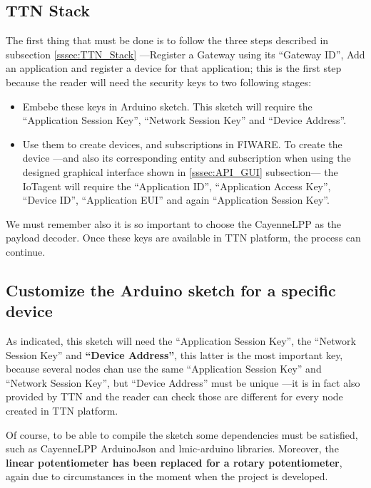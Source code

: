 \documentclass[11pt,a4paper,dvipsnames,twoside]{article}
\begin{document}
\subsection{TTN Stack}
The first thing that must be done is to follow the three steps described in subsection \ref{sssec:TTN_Stack} ---Register a Gateway using its \enquote{Gateway ID}, Add an application and register a device for that application; this is the first step because the reader will need the security keys to two following stages:

\begin{itemize}
  \item Embebe these keys in Arduino sketch. This sketch will require the \enquote{Application Session Key}, \enquote{Network Session Key} and \enquote{Device Address}.
  \item Use them to create devices, and subscriptions in FIWARE. To create the device ---and also its corresponding entity and subscription when using the designed graphical interface shown in \ref{sssec:API_GUI} subsection--- the IoTagent will require the \enquote{Application ID}, \enquote{Application Access Key}, \enquote{Device ID}, \enquote{Application EUI} and again \enquote{Application Session Key}.
\end{itemize}

We must remember also it is so important to choose the CayenneLPP as the payload decoder. Once these keys are available in TTN platform, the process can continue.

\subsection{Customize the Arduino sketch for a specific device}
As indicated, this sketch will need the \enquote{Application Session Key}, the \enquote{Network Session Key} and \textbf{\enquote{Device Address}}, this latter is the most important key, because several nodes chan use the same \enquote{Application Session Key} and \enquote{Network Session Key}, but \enquote{Device Address} must be unique ---it is in fact also provided by TTN and the reader can check those are different for every node created in TTN platform. 

Of course, to be able to compile the sketch some dependencies must be satisfied, such as CayenneLPP ArduinoJson and lmic-arduino libraries. Moreover, the \textbf{linear potentiometer has been replaced for a rotary potentiometer}, again due to circumstances in the moment when the project is developed.
\end{document}
